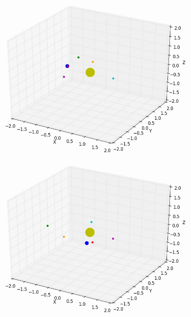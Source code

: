 \documentclass[10pt,letterpaper]{article}
\begin{document}
\begin{figure}[!htb]
  \includegraphics[width=\linewidth]{figures/lagrange_points/lagrange_points_l2_vy_01_1.png}
  \subcaption{}\label{fig:lagrange_points_l2_vy_01_fig1}
\endminipage\hfill
{}
  \includegraphics[width=\linewidth]{figures/lagrange_points/lagrange_points_l2_vy_01_2.png}
  \subcaption{}\label{fig:lagrange_points_l2_vy_01_fig2}
\endminipage\hfill
{}%

\end{figure}
\end{document}
